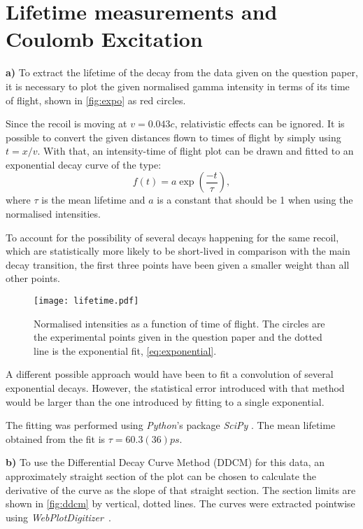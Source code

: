 \section{Lifetime measurements and Coulomb Excitation}

\textbf{a)} To extract the lifetime of the decay from the data given on the question paper, it is necessary to plot the given normalised gamma intensity in terms of its time of flight, shown in \autoref{fig:expo} as red circles. 

Since the recoil is moving at $v = 0.043\unit{c}$, relativistic effects can be ignored. It is possible to convert the given distances flown to times of flight by simply using $t = x/v$. With that, an intensity-time of flight plot can be drawn and fitted to an exponential decay curve of the type:
\begin{equation}
    \label{eq:exponential}
    f(t) = a\exp{\left(\frac{-t}{\tau}\right)},
\end{equation} where $\tau$ is the mean lifetime and $a$ is a constant that should be 1 when using the normalised intensities.

To account for the possibility of several decays happening for the same recoil, which are statistically more likely to be short-lived in comparison with the main decay transition, the first three points have been given a smaller weight than all other points.

\begin{figure}[ht]
    \centering
    \texttt{[image: lifetime.pdf]}
    \caption{Normalised intensities as a function of time of flight. The circles are the experimental points given in the question paper and the dotted line is the exponential fit, \autoref{eq:exponential}.}
    \label{fig:expo}
\end{figure}

A different possible approach would have been to fit a convolution of several exponential decays. However, the statistical error introduced with that method would be larger than the one introduced by fitting to a single exponential.

The fitting was performed using \textit{Python}'s package \textit{SciPy} \cite{scipy}. The mean lifetime obtained from the fit is $\tau = 60.3(36)\unit{ps}$. 

\textbf{b)} To use the Differential Decay Curve Method (DDCM) for this data, an approximately straight section of the plot can be chosen to calculate the derivative of the curve as the slope of that straight section. The section limits are shown in \autoref{fig:ddcm} by vertical, dotted lines. The curves were extracted pointwise using \textit{WebPlotDigitizer}~\cite{wpd}.

